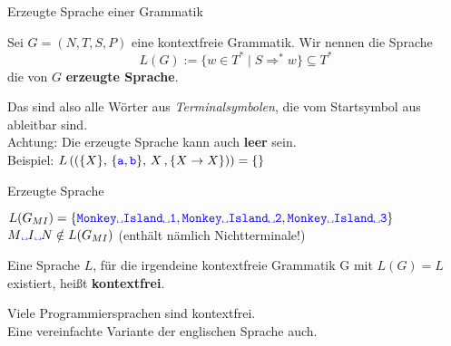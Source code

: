 \begin{frame}{Erzeugte Sprache einer Grammatik}
	\begin{Definition}
		Sei $G = (N, T, S, P)$ eine kontextfreie Grammatik. Wir nennen die Sprache $$L(G) := \{w \in T^\ast \mid S \Rightarrow^\ast w \} \subseteq T^*$$ die von $G$ \textbf{erzeugte Sprache}.
	\end{Definition} \pause
	Das sind also alle Wörter aus \emph{Terminalsymbolen}, die vom Startsymbol aus ableitbar sind.\\
	\bigskip
	Achtung: Die erzeugte Sprache kann auch \textbf{leer} sein. \\
	Beispiel: \pause $L\left(\left(\{X\},\, \{\hbox{\textcolor{blue}{\texttt{a}}}, \hbox{\textcolor{blue}{\texttt{b}}}\},\, X\, ,\{X\to X\}\right)\right) = \{\}$
\end{frame}

\begin{frame}{Erzeugte Sprache}
	\begin{Beispiel}
		$L(G_{MI}) = \{\word{Monkey\sp Island\sp1}, \word{Monkey\sp Island\sp 2}, \word{Monkey\sp Island\sp 3}\}$\\
		$M\wordsp I\wordsp N \notin L(G_{MI})$ \quad (enthält nämlich  Nichtterminale!)
	\end{Beispiel}
	
	\pause
	\begin{Definition}
		Eine Sprache $L$, für die irgendeine kontextfreie Grammatik G mit $L(G) = L$ existiert, heißt \textbf{kontextfrei}.
	\end{Definition}
	\medskip
	
	Viele Programmiersprachen sind kontextfrei. \\
	Eine vereinfachte Variante der englischen Sprache auch. \smiley
		
\end{frame}

